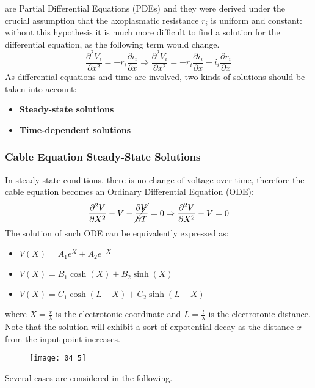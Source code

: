 are Partial Differential Equations (PDEs) and they were derived under the crucial
assumption that the axoplasmatic resistance \(r_{i}\) is uniform and constant: without this
hypothesis it is much more difficult to find a solution for the differential equation, as the
following term would change.
\begin{equation*}
    \frac{\partial^{2}V_{i}}{\partial{x^{2}}}=-r_{i}\frac{\partial{i_{i}}}{\partial{x}}
    \Rightarrow
    \frac{\partial^{2}V_{i}}{\partial{x^{2}}}=
    -r_{i}\frac{\partial{i_{i}}}{\partial{x}}-i_{i}\frac{\partial{r_{i}}}{\partial{x}}
\end{equation*}
As differential equations and time are involved, two kinds of solutions should be taken into
account:
\begin{itemize}
    \item \textbf{Steady-state solutions}
    \item \textbf{Time-dependent solutions}
\end{itemize}
\subsubsection{Cable Equation Steady-State Solutions}
In steady-state conditions, there is no change of voltage over time, therefore
the cable equation becomes an Ordinary Differential Equation (ODE):
\begin{equation*}
    \frac{\partial^{2}{V}}{\partial{X^{2}}}-V-\cancel{\frac{\partial{V}}{\partial{T}}}=0
    \Rightarrow
    \frac{\partial^{2}{V}}{\partial{X^{2}}}-V=0
\end{equation*}
The solution of such ODE can be equivalently expressed as:
\begin{itemize}
    \item \(V(X)=A_{1}e^{X}+A_{2}e^{-X}\)
    \item \(V(X)=B_{1}\cosh{(X)}+B_{2}\sinh{(X)}\)
    \item \(V(X)=C_{1}\cosh{(L-X)}+C_{2}\sinh{(L-X)}\)
\end{itemize}
where \(X=\frac{x}{\lambda}\) is the electrotonic coordinate and \(L=\frac{l}{\lambda}\)
is the electrotonic distance. Note that the solution will exhibit a sort of
expotential decay as the distance \(x\) from the input point increases.
\begin{figure}[H]
    \texttt{[image: 04\_5]}
    \centering
\end{figure}
Several cases are considered in the following.
